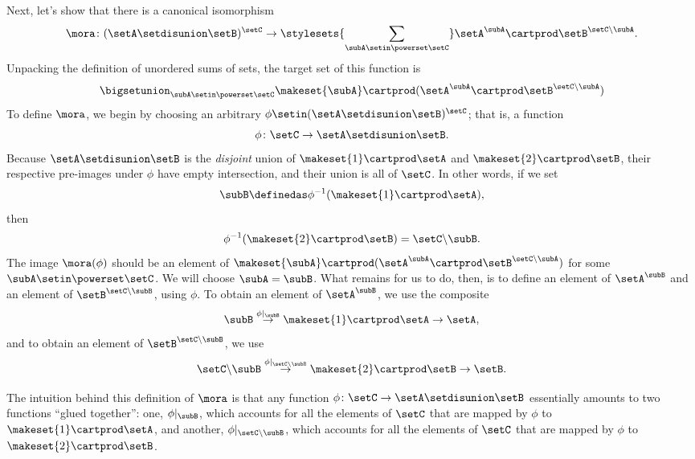 Next, let's show that there is a canonical isomorphism
\begin{equation}
    \mora \colon (\setA \setdisunion \setB)^{\setC}  \to \stylesets{\sum_{\subA \setin \powerset \setC}} \setA^\subA \cartprod \setB^{\setC \backslash \subA}.
\end{equation}
Unpacking the definition of unordered sums of sets, the target set of this function is
\begin{equation}
    \bigsetunion_{\subA \setin  \powerset \setC} \makeset{\subA} \cartprod (\setA^{\subA} \cartprod \setB^{\setC \backslash \subA} )
\end{equation}
To define $\mora$, we begin by choosing an arbitrary $\phi \setin (\setA \setdisunion \setB)^{\setC}$; that is, a function
\begin{equation}
    \phi \colon \setC \to \setA \setdisunion \setB.
\end{equation}
Because $\setA \setdisunion \setB$ is the \emph{disjoint} union of $\makeset{1} \cartprod \setA$ and $\makeset{2} \cartprod \setB$, their respective pre-images under $\phi$ have empty intersection, and their union is all of $\setC$.
In other words, if we set
\begin{equation}
    \subB \definedas \phi^{-1}(\makeset{1} \cartprod \setA),
\end{equation}
then
\begin{equation}
    \phi^{-1}(\makeset{2} \cartprod \setB)  = \setC \backslash \subB.
\end{equation}
The image $\mora(\phi)$ should be an element of $\makeset{\subA} \cartprod (\setA^{\subA} \cartprod \setB^{\setC \backslash \subA} )$ for some $\subA \setin \powerset \setC$.
We will choose $\subA = \subB$.
What remains for us to do, then, is to define an element of $\setA^{\subB}$ and an element of $\setB^{\setC \backslash \subB}$, using $\phi$.
To obtain an element of $\setA^{\subB}$, we use the composite
\begin{equation}
    \subB \overset{\phi \vert_\subB}{\to} \makeset{1} \cartprod \setA \to \setA,
\end{equation}
and to obtain an element of $\setB^{\setC \backslash \subB}$, we use
\begin{equation}
    \setC \backslash \subB \overset{\phi \vert_{\setC \backslash \subB}}{\to} \makeset{2} \cartprod \setB \to \setB.
\end{equation}

The intuition behind this definition of $\mora$ is that any function $\phi \colon \setC \to \setA \setdisunion \setB
$ essentially amounts to two functions ``glued together'': one, $\phi \vert_\subB$, which accounts for all the elements of $\setC$ that are mapped by $\phi$ to $\makeset{1} \cartprod \setA$, and another, $\phi \vert_{\setC \backslash \subB}$, which accounts for all the elements of $\setC$ that are mapped by $\phi$ to $\makeset{2} \cartprod \setB$.

